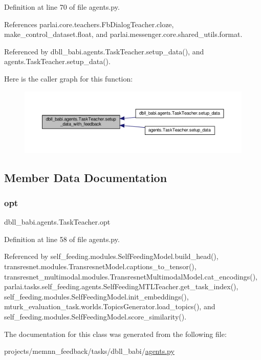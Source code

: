 Definition at line 70 of file agents.\+py.



References parlai.\+core.\+teachers.\+Fb\+Dialog\+Teacher.\+cloze, make\+\_\+control\+\_\+dataset.\+float, and parlai.\+messenger.\+core.\+shared\+\_\+utils.\+format.



Referenced by dbll\+\_\+babi.\+agents.\+Task\+Teacher.\+setup\+\_\+data(), and agents.\+Task\+Teacher.\+setup\+\_\+data().

Here is the caller graph for this function\+:
\nopagebreak
\begin{figure}[H]
\begin{center}
\leavevmode
\includegraphics[width=350pt]{classdbll__babi_1_1agents_1_1TaskTeacher_a3275c0a4a11a3f5e723259d487db03f8_icgraph}
\end{center}
\end{figure}


\subsection{Member Data Documentation}
\mbox{\label{classdbll__babi_1_1agents_1_1TaskTeacher_abe6872d5eda75ca8a15ecf4785086c48}} 
\subsubsection{\texorpdfstring{opt}{opt}}
{\footnotesize\ttfamily dbll\+\_\+babi.\+agents.\+Task\+Teacher.\+opt}



Definition at line 58 of file agents.\+py.



Referenced by self\+\_\+feeding.\+modules.\+Self\+Feeding\+Model.\+build\+\_\+head(), transresnet.\+modules.\+Transresnet\+Model.\+captions\+\_\+to\+\_\+tensor(), transresnet\+\_\+multimodal.\+modules.\+Transresnet\+Multimodal\+Model.\+cat\+\_\+encodings(), parlai.\+tasks.\+self\+\_\+feeding.\+agents.\+Self\+Feeding\+M\+T\+L\+Teacher.\+get\+\_\+task\+\_\+index(), self\+\_\+feeding.\+modules.\+Self\+Feeding\+Model.\+init\+\_\+embeddings(), mturk\+\_\+evaluation\+\_\+task.\+worlds.\+Topics\+Generator.\+load\+\_\+topics(), and self\+\_\+feeding.\+modules.\+Self\+Feeding\+Model.\+score\+\_\+similarity().



The documentation for this class was generated from the following file\+:\begin{DoxyCompactItemize}
\item 
projects/memnn\+\_\+feedback/tasks/dbll\+\_\+babi/\hyperlink{projects_2memnn__feedback_2tasks_2dbll__babi_2agents_8py}{agents.\+py}\end{DoxyCompactItemize}
